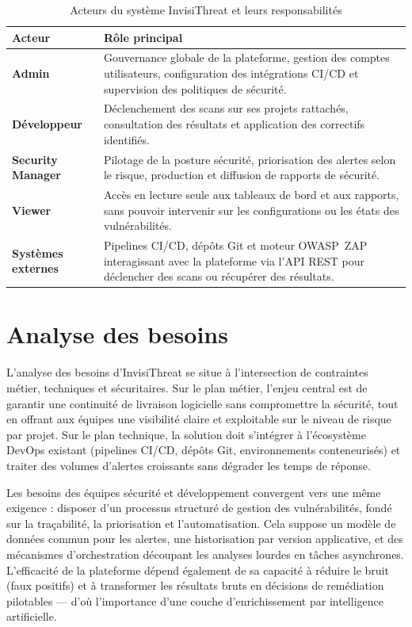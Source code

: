 \begin{table}[H]
\centering
\caption{Acteurs du système InvisiThreat et leurs responsabilités}
\label{tab:acteurs}
\renewcommand{\arraystretch}{1.3}
\begin{tabularx}{\textwidth}{p{3cm} X}
\hline
\rowcolor{gray!15}
\textbf{Acteur} & \textbf{Rôle principal} \\
\hline
\textbf{Admin}
  & Gouvernance globale de la plateforme, gestion des comptes utilisateurs,
    configuration des intégrations CI/CD et supervision des politiques de sécurité. \\
\textbf{Développeur}
  & Déclenchement des scans sur ses projets rattachés, consultation des résultats
    et application des correctifs identifiés. \\
\textbf{Security Manager}
  & Pilotage de la posture sécurité, priorisation des alertes selon le risque,
    production et diffusion de rapports de sécurité. \\
\textbf{Viewer}
  & Accès en lecture seule aux tableaux de bord et aux rapports, sans pouvoir
    intervenir sur les configurations ou les états des vulnérabilités. \\
\textbf{Systèmes externes}
  & Pipelines CI/CD, dépôts Git et moteur OWASP~ZAP interagissant avec la
    plateforme via l'API REST pour déclencher des scans ou récupérer des résultats. \\
\hline
\end{tabularx}
\end{table}

\section{Analyse des besoins}

L'analyse des besoins d'InvisiThreat se situe à l'intersection de contraintes métier,
techniques et sécuritaires. Sur le plan métier, l'enjeu central est de garantir
une continuité de livraison logicielle sans compromettre la sécurité, tout en offrant
aux équipes une visibilité claire et exploitable sur le niveau de risque par projet.
Sur le plan technique, la solution doit s'intégrer à l'écosystème DevOps existant
(pipelines CI/CD, dépôts Git, environnements conteneurisés) et traiter des volumes
d'alertes croissants sans dégrader les temps de réponse.

Les besoins des équipes sécurité et développement convergent vers une même exigence :
disposer d'un processus structuré de gestion des vulnérabilités, fondé sur la
traçabilité, la priorisation et l'automatisation. Cela suppose un modèle de données
commun pour les alertes, une historisation par version applicative, et des mécanismes
d'orchestration découpant les analyses lourdes en tâches asynchrones. L'efficacité
de la plateforme dépend également de sa capacité à réduire le bruit (faux positifs)
et à transformer les résultats bruts en décisions de remédiation pilotables —
d'où l'importance d'une couche d'enrichissement par intelligence artificielle.

